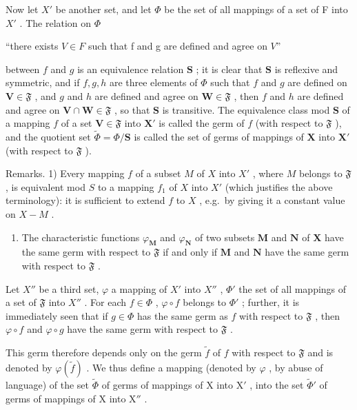 Now let \(X'\) be another set, and let \(\Phi\) be the set of all mappings of a set of F into \(X'\) . The relation on \(\Phi\)

``there exists \(V \in F\) such that f and g are defined and agree on \(V\)''

between \(f\) and \(g\) is an equivalence relation \(\mathbf{S}\) ; it is clear that \(\mathbf{S}\) is reflexive and symmetric, and if \(f, g, h\) are three elements of \(\Phi\) such that \(f\) and \(g\) are defined on \(\mathbf{V} \in \mathfrak{F}\) , and \(g\) and \(h\) are defined and agree on \(\mathbf{W} \in \mathfrak{F}\) , then \(f\) and \(h\) are defined and agree on \(\mathbf{V} \cap \mathbf{W} \in \mathfrak{F}\) , so that \(\mathbf{S}\) is transitive. The equivalence class mod \(\mathbf{S}\) of a mapping \(f\) of a set \(\mathbf{V} \in \mathfrak{F}\) into \(\mathbf{X}'\) is called the germ of \(f\) (with respect to \(\mathfrak{F}\) ), and the quotient set \(\tilde{\Phi} = \Phi / \mathbf{S}\) is called the set of germs of mappings of \(\mathbf{X}\) into \(\mathbf{X}'\) (with respect to \(\mathfrak{F}\) ).

Remarks. 1) Every mapping \(f\) of a subset \(M\) of \(X\) into \(X'\) , where \(M\) belongs to \(\mathfrak{F}\) , is equivalent mod \(S\) to a mapping \(f_1\) of \(X\) into \(X'\) (which justifies the above terminology): it is sufficient to extend \(f\) to \(X\) , e.g.~by giving it a constant value on \(X - M\) .

\begin{enumerate}
\def\labelenumi{\arabic{enumi})}
\setcounter{enumi}{1}
\tightlist
\item
  The characteristic functions \(\varphi_{\mathbf{M}}\) and \(\varphi_{\mathbf{N}}\) of two subsets \(\mathbf{M}\) and \(\mathbf{N}\) of \(\mathbf{X}\) have the same germ with respect to \(\mathfrak{F}\) if and only if \(\mathbf{M}\) and \(\mathbf{N}\) have the same germ with respect to \(\mathfrak{F}\) .
\end{enumerate}

Let \(X''\) be a third set, \(\varphi\) a mapping of \(X'\) into \(X''\) , \(\Phi'\) the set of all mappings of a set of \(\mathfrak{F}\) into \(X''\) . For each \(f \in \Phi\) , \(\varphi \circ f\) belongs to \(\Phi'\) ; further, it is immediately seen that if \(g \in \Phi\) has the same germ as \(f\) with respect to \(\mathfrak{F}\) , then \(\varphi \circ f\) and \(\varphi \circ g\) have the same germ with respect to \(\mathfrak{F}\) .

This germ therefore depends only on the germ \(\tilde{f}\) of \(f\) with respect to \(\mathfrak{F}\) and is denoted by \(\varphi(\tilde{f})\) . We thus define a mapping (denoted by \(\varphi\) , by abuse of language) of the set \(\tilde{\Phi}\) of germs of mappings of X into \(\mathrm{X}'\) , into the set \(\tilde{\Phi}'\) of germs of mappings of X into \(\mathrm{X}''\) .

